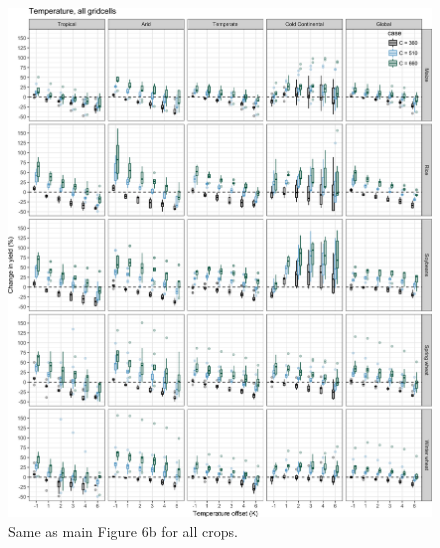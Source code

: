 \documentclass[10pt]{article}
\begin{document}
\begin{figure}[h!]
    \centering
    \includegraphics[width=\textwidth]{s_sim_CG_TC.png}
    \caption{Same as main Figure 6b for all crops.}
    \label{fig:carbontemp}
\end{figure}
\end{document}
